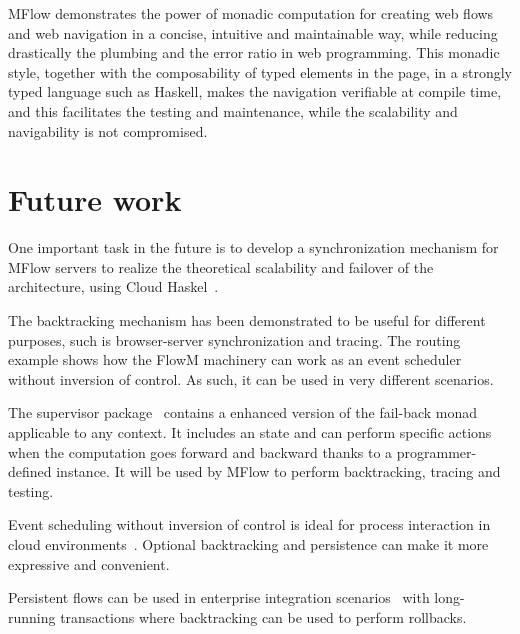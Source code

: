\documentclass{tmr}
\begin{document}
MFlow demonstrates the power of monadic computation for creating web flows and web navigation in a concise, intuitive and maintainable way, while reducing drastically the plumbing and the error ratio in web programming. This monadic style, together with the composability of typed elements in the page, in a strongly typed language such as Haskell, makes the navigation verifiable at compile time, and this facilitates the testing and maintenance, while the scalability and navigability is not compromised.  
  
\section{Future work}  
  
One important task in the future is to develop a synchronization mechanism for MFlow servers to realize the theoretical scalability and failover of the architecture, using Cloud Haskel~\cite{auth:cloudhaskell}.  
  
The backtracking mechanism has been demonstrated  to be useful for different purposes, such is browser-server synchronization and tracing. The routing example shows how the FlowM machinery can work as an event scheduler without inversion of control.  As such, it can be used in very different scenarios. 

The supervisor package~\cite{auth:supervisor} contains a enhanced version of the fail-back monad applicable to any context. It includes an state  and can perform specific actions when the computation goes forward and backward thanks to a programmer-defined instance. It will  be used by MFlow to perform backtracking, tracing and testing.


Event scheduling without inversion of control is ideal for process interaction in cloud environments~\cite{auth:scalacloud}. Optional backtracking and persistence can make it more expressive and convenient.  
  
Persistent flows can be used in enterprise integration scenarios~\cite{auth:integration} with long-running transactions where backtracking can be used to perform rollbacks.
  
  
  
  
\end{document}
